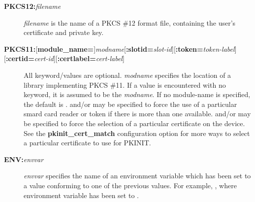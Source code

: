 \documentclass[letterpaper,10pt,english]{sphinxmanual}
\begin{document}
\begin{description}
\item[{\textbf{PKCS12:}\emph{filename}}] \leavevmode
\emph{filename} is the name of a PKCS \#12 format file, containing the
user's certificate and private key.

\item[{\textbf{PKCS11:}{[}\textbf{module\_name=}{]}\emph{modname}{[}\textbf{:slotid=}\emph{slot-id}{]}{[}\textbf{:token=}\emph{token-label}{]}{[}\textbf{:certid=}\emph{cert-id}{]}{[}\textbf{:certlabel=}\emph{cert-label}{]}}] \leavevmode
All keyword/values are optional.  \emph{modname} specifies the location
of a library implementing PKCS \#11.  If a value is encountered
with no keyword, it is assumed to be the \emph{modname}.  If no
module-name is specified, the default is .
 and/or  may be specified to force the use of
a particular smard card reader or token if there is more than one
available.   and/or  may be specified to
force the selection of a particular certificate on the device.
See the \textbf{pkinit\_cert\_match} configuration option for more ways
to select a particular certificate to use for PKINIT.

\item[{\textbf{ENV:}\emph{envvar}}] \leavevmode
\emph{envvar} specifies the name of an environment variable which has
been set to a value conforming to one of the previous values.  For
example, , where environment variable
 has been set to .

\end{description}
\end{document}
